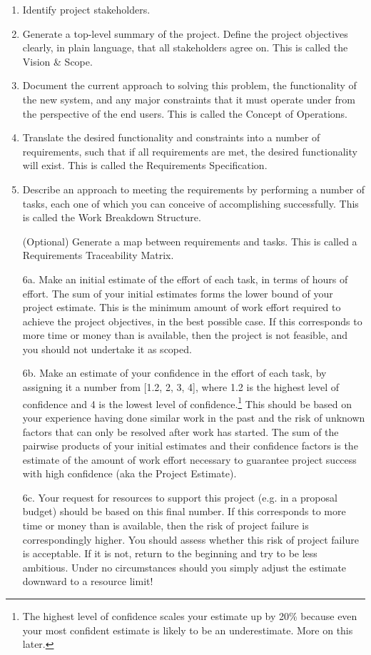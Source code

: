 \documentclass[12pt,oneside]{book}
\begin{document}
\begin{enumerate}[wide, labelwidth=!, labelindent=0pt, font=\bfseries]
\item Identify project stakeholders.
\item Generate a top-level summary of the project. Define the project objectives clearly, in plain language, that all stakeholders agree on. This is called the Vision \& Scope.
\item Document the current approach to solving this problem, the functionality of the new system, and any major constraints that it must operate under from the perspective of the end users. This is called the Concept of Operations.
\item Translate the desired functionality and constraints into a number of requirements, such that if all requirements are met, the desired functionality will exist. This is called the Requirements Specification.
\item Describe an approach to meeting the requirements by performing a number of tasks, each one of which you can conceive of accomplishing successfully. This is called the Work Breakdown Structure.
\item[(Optional)] Generate a map between requirements and tasks. This is called a Requirements Traceability Matrix.
\item[6a.] Make an initial estimate of the effort of each task, in terms of hours of effort. The sum of your initial estimates forms the lower bound of your project estimate. This is the minimum amount of work effort required to achieve the project objectives, in the best possible case. If this corresponds to more time or money than is available, then the project is not feasible, and you should not undertake it as scoped.
\item[6b.] Make an estimate of your confidence in the effort of each task, by assigning it a number from [1.2, 2, 3, 4], where 1.2 is the highest level of confidence and 4 is the lowest level of confidence.\footnote{The highest level of confidence scales your estimate up by 20\% because even your most confident estimate is likely to be an underestimate. More on this later.} This should be based on your experience having done similar work in the past and the risk of unknown factors that can only be resolved after work has started. The sum of the pairwise products of your initial estimates and their confidence factors is the estimate of the amount of work effort necessary to guarantee project success with high confidence (aka the Project Estimate).
\item[6c.] Your request for resources to support this project (e.g. in a proposal budget) should be based on this final number. If this corresponds to more time or money than is available, then the risk of project failure is correspondingly higher. You should assess whether this risk of project failure is acceptable. If it is not, return to the beginning and try to be less ambitious. Under no circumstances should you simply adjust the estimate downward to a resource limit!
\end{enumerate}
\end{document}

